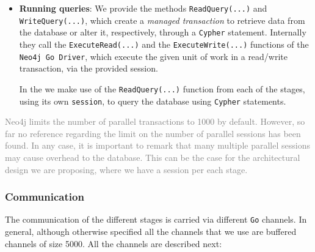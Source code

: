 \begin{itemize}
    \item \textbf{Running queries}: We provide the methods \texttt{ReadQuery(...)} and \texttt{WriteQuery(...)}, which create a \textit{managed transaction} to retrieve data from the database or alter it, respectively, through a \texttt{Cypher} statement. 
    Internally they call the \texttt{ExecuteRead(...)} and the \texttt{ExecuteWrite(...)} functions of the \texttt{Neo4j Go Driver}, which execute the given unit of work in a read/write transaction, via the provided session.

    In the \DPATM we make use of the \texttt{ReadQuery(...)} function from each of the \filter stages, using its own \texttt{session}, to query the database using \texttt{Cypher} statements.
\end{itemize}

\textcolor{gray}{Neo4j limits the number of parallel transactions to 1000 by default. However, so far no reference regarding the limit on the number of parallel sessions has been found. In any case, it is important to remark that many multiple parallel sessions may cause overhead to the database. This can be the case for the architectural design we are proposing, where we have a session per each \filter stage.}

\subsubsection*{Communication}

The communication of the different stages is carried via different \texttt{Go} channels. In general, although otherwise specified all the channels that we use are buffered channels of size 5000. All the channels are described next:

